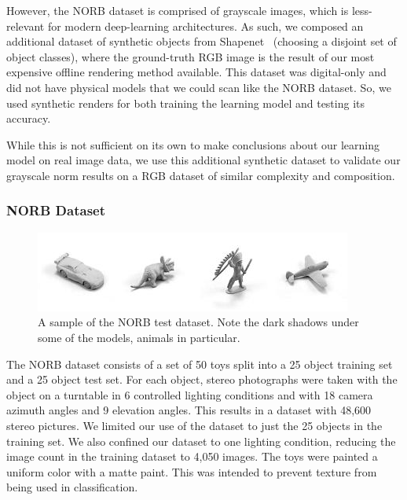\documentclass[10pt,twocolumn,letterpaper]{article}
\begin{document}
However, the NORB dataset is comprised of grayscale images, which is less-relevant for modern deep-learning architectures. As such, we composed an additional dataset of synthetic objects from Shapenet~\cite{DBLP:journals/corr/ChangFGHHLSSSSX15} (choosing a disjoint set of object classes), where the ground-truth RGB image is the result of our most expensive offline rendering method available. This dataset was digital-only and did not have physical models that we could scan like the NORB dataset. So, we used synthetic renders for both training the learning model and testing its accuracy.

While this is not sufficient on its own to make conclusions about our learning model on real image data, we use this additional synthetic dataset to validate our grayscale norm results on a RGB dataset of similar complexity and composition. %

\subsubsection{NORB Dataset}\label{NORB-DATASET}
\begin{figure}[h!]
\centering
\includegraphics[width=1.0\columnwidth]{./assets/NORBTestSmall.png}
\caption{A sample of the NORB test dataset. Note the dark shadows under some of the models, animals in particular.}
\label{fig:norb-samples}
\end{figure}

The NORB dataset consists of a set of 50 toys split into a 25 object training set and a 25 object test set. For each object, stereo photographs were taken with the object on a turntable in 6 controlled lighting conditions and with 18 camera azimuth angles and 9 elevation angles. This results in a dataset with 48,600 stereo pictures.  We limited our use of the dataset to just the 25 objects in the training set. We also confined our dataset to one lighting condition, reducing the image count in the training dataset to 4,050 images. The toys were painted a uniform color with a matte paint. This was intended to prevent texture from being used in classification.
\end{document}
